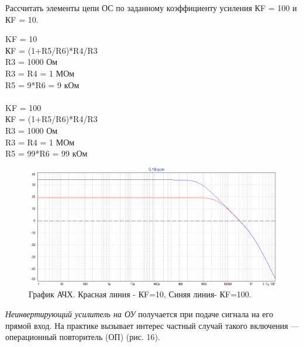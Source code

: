 \documentclass[a4paper,14pt]{extarticle}
\begin{document}
    Рассчитать элементы цепи ОС по заданному коэффициенту усиления КF = 100
    и КF = 10.
    \begin{multicols}{2}
        \begin{tabbing}
            \noindent KF = 10\=\\
            \>КF = (1+R5/R6)*R4/R3\\
            \>R3 = 1000 Ом\\
            \>R3 = R4 = 1 МОм\\
            \>R5 = 9*R6 = 9 кОм\\\\

            KF = 100\=\\
            \>КF = (1+R5/R6)*R4/R3\\
            \>R3 = 1000 Ом\\
            \>R3 = R4 = 1 МОм\\
            \>R5 = 99*R6 = 99 кОм\\
        \end{tabbing}
    \end{multicols}
    \begin{figure}[h!]
        \begin{center}
            \includegraphics[scale=0.5]{13.png}
        \end{center}
        \vspace{-0.7cm}
        \caption{График АЧХ. Красная линия - КF=10, Синяя линия- КF=100.}
    \end{figure}
   
    \emph{Неинвертирующий усилитель на ОУ} получается при подаче сигнала 
    на его прямой вход. На практике вызывает интерес частный случай 
    такого включения — операционный повторитель (ОП) (рис. 16).
\end{document}
